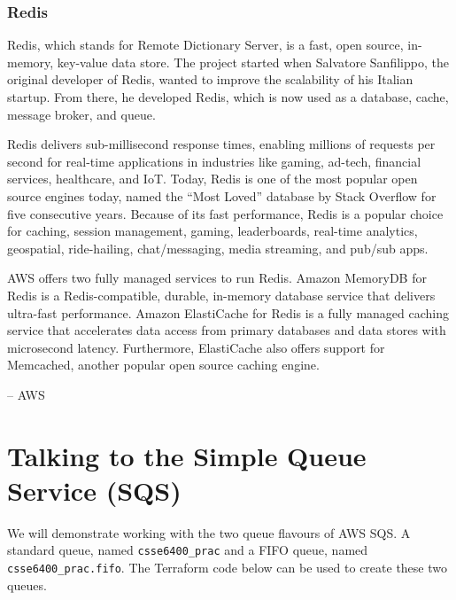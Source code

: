 \documentclass{csse4400}
\begin{document}
\subsubsection{Redis}
\begin{oldquote}
Redis, which stands for Remote Dictionary Server,
is a fast, open source, in-memory, key-value data store.
The project started when Salvatore Sanfilippo,
the original developer of Redis,
wanted to improve the scalability of his Italian startup.
From there, he developed Redis,
which is now used as a database, cache, message broker, and queue.

Redis delivers sub-millisecond response times,
enabling millions of requests per second for real-time applications in industries like gaming, ad-tech, financial services, healthcare, and IoT.
Today, Redis is one of the most popular open source engines today,
named the ``Most Loved'' database by Stack Overflow for five consecutive years.
Because of its fast performance,
Redis is a popular choice for caching, session management, gaming, leaderboards, real-time analytics, geospatial, ride-hailing, chat/messaging, media streaming, and pub/sub apps.
  
AWS offers two fully managed services to run Redis.
Amazon MemoryDB for Redis is a Redis-compatible, durable, in-memory database service that delivers ultra-fast performance.
Amazon ElastiCache for Redis is a fully managed caching service that accelerates data access from primary databases and data stores with microsecond latency.
Furthermore, ElastiCache also offers support for Memcached, another popular open source caching engine.

\raggedleft -- AWS
\end{oldquote}



\section{Talking to the Simple Queue Service (SQS)}


We will demonstrate working with the two queue flavours of AWS SQS.
A standard queue, named \texttt{csse6400\_prac} and a FIFO queue, named \texttt{csse6400\_prac.fifo}.
The Terraform code below can be used to create these two queues.
\end{document}
